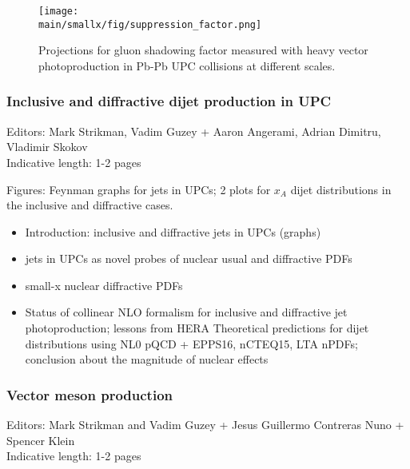 \documentclass[../report.tex]{subfiles}
\providecommand{\main}{..}
\begin{document}
\begin{figure}
\centering
\texttt{[image: \\main/smallx/fig/suppression\_factor.png]}
\caption{Projections for gluon shadowing factor measured with heavy vector photoproduction in Pb-Pb UPC collisions at different scales.}
\label{fig:r}
\end{figure}

\subsubsection{Inclusive and diffractive dijet production in UPC}
Editors: Mark Strikman, Vadim Guzey + Aaron Angerami, Adrian Dimitru, Vladimir Skokov\\
Indicative length: 1-2 pages

Figures: Feynman graphs for jets in UPCs; 2 plots for $x_A$ dijet distributions in the inclusive
and diffractive cases.
\begin{itemize}
\item Introduction: inclusive and diffractive jets in UPCs (graphs)
\item jets in UPCs as novel probes of nuclear usual and diffractive PDFs
\item small-x nuclear diffractive PDFs
\item Status of collinear NLO formalism for inclusive and diffractive jet photoproduction;
lessons from HERA
Theoretical predictions for dijet distributions using NL0 pQCD + EPPS16, nCTEQ15, LTA nPDFs; conclusion about the magnitude of nuclear effects\end{itemize}

\subsubsection{Vector meson production}
Editors: Mark Strikman and Vadim Guzey + Jesus Guillermo Contreras Nuno + Spencer Klein\\
Indicative length: 1-2 pages

\end{document}
